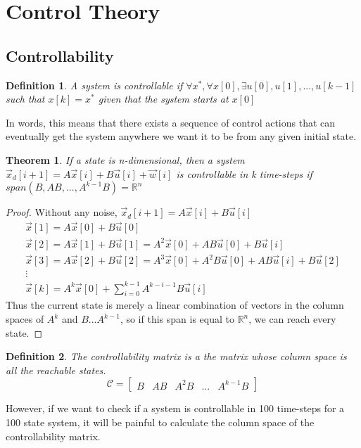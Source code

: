\documentclass{article}
\newtheorem{theorem}{Theorem}
\newtheorem{definition}{Definition}
\newtheorem{proof}{Proof}
\begin{document}
\section{Control Theory}
\subsection{Controllability}
\begin{definition}
    A system is controllable if $\forall x^*, \forall x[0], \exists u[0],u[1],...,u[k-1]$ such that $x[k]=x^*$ given that the system starts at $x[0]$
\end{definition}
In words, this means that there exists a sequence of control actions that can eventually get the system anywhere we want it to be from any given initial state.
\begin{theorem}
    If a state is n-dimensional, then a system $\vec{x}_d[i+1]=A\vec{x}[i]+B\vec{u}[i]+\vec{w}[i]$ is controllable in k time-steps if $span(B, AB, ..., A^{k-1}B)=\mathbb{R}^n$
\end{theorem}
\begin{proof}
    Without any noise, $\vec{x}_d[i+1]=A\vec{x}[i]+B\vec{u}[i]$
    \[
        \begin{array}{c}
            \vec{x}[1]=A\vec{x}[0]+B\vec{u}[0]\\
            \vec{x}[2]=A\vec{x}[1]+B\vec{u}[1] = A^2\vec{x}[0]+AB\vec{u}[0]+B\vec{u}[i]\\
            \vec{x}[3]=A\vec{x}[2]+B\vec{u}[2] = A^3\vec{x}[0]+A^2B\vec{u}[0]+AB\vec{u}[i]+B\vec{u}[2]\\
            \vdots\\
            \vec{x}[k]=A^k\vec{x}[0]+\sum_{i=0}^{k-1}{A^{k-i-1}B\vec{u}[i]}
        \end{array}
        \]
    Thus the current state is merely a linear combination of vectors in the column spaces of $A^k$ and $B...A^{k-1}$, so if this span is equal to $\mathbb{R}^n$, we can reach every state.
\end{proof}
\begin{definition}
    The controllability matrix is a the matrix whose column space is all the reachable states.
    \[
        \mathcal{C} = \left[
            \begin{array}{c|c|c|c|c}
                B & AB & A^2B & ... & A^{k-1}B
            \end{array}
        \right]
        \]
\end{definition}
However, if we want to check if a system is controllable in 100 time-steps for a 100 state system, it will be painful to calculate the column space of the controllability matrix.
\end{document}
